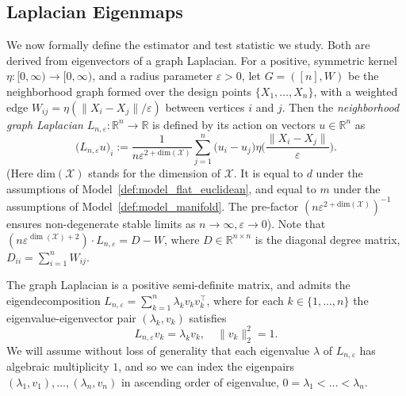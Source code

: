 \documentclass[aos]{imsart}
\theoremstyle{plain}
\theoremstyle{definition}
\theoremstyle{remark}
\def\R{\mathbb{R}}
\newcommand{\mc}[1]{\mathcal{#1}}
\newcommand{\Reals}{\mathbb{R}} %
\newcommand{\1}{\mathbf{1}}
\begin{document}
\subsection{Laplacian Eigenmaps}
\label{subsec:laplacian_eigenmaps}
We now formally define the estimator and test statistic we study. Both are derived from eigenvectors of a graph Laplacian.  For a positive, symmetric kernel $\eta: [0,\infty) \to [0,\infty)$, and a radius parameter $\varepsilon > 0$, let $G = ([n],W)$ be the neighborhood graph formed over the design points $\{X_1,\ldots,X_n\}$, with a weighted edge $W_{ij} = \eta(\|X_i - X_j\|/\varepsilon)$ between vertices $i$ and $j$. Then the 
\emph{neighborhood graph Laplacian} $L_{n,\varepsilon}: \Reals^n \to \Reals$ is defined by its action on vectors $u \in \Reals^n$ as
\begin{equation}
\label{eqn:neighborhood_graph_laplacian}
\bigl(L_{n,\varepsilon}u\bigr)_i := \frac{1}{n\varepsilon^{2 + \mathrm{dim}(\mc{X})}} \sum_{j = 1}^{n} \bigl(u_i - u_j\bigr) \eta\biggl(\frac{\|X_i - X_j\|}{\varepsilon}\biggr).
\end{equation}
(Here $\mathrm{dim}(\mc{X})$ stands for the dimension of $\mc{X}$. It is equal to $d$ under the assumptions of Model~\ref{def:model_flat_euclidean}, and equal to $m$ under the assumptions of Model~\ref{def:model_manifold}. The pre-factor $(n\varepsilon^{2 + \mathrm{dim}(\mc{X})})^{-1}$ ensures non-degenerate stable limits as $n \to \infty, \varepsilon \to 0$). Note that $(n\varepsilon^{\dim(\mc{X}) + 2}) \cdot L_{n,\varepsilon} = D - W$, where $D \in \Reals^{n \times n}$ is the diagonal degree matrix, $D_{ii} = \sum_{i = 1}^{n} W_{ij}$.

The graph Laplacian is a positive semi-definite matrix, and admits the eigendecomposition $L_{n,\varepsilon} = \sum_{k = 1}^{n} \lambda_k v_k v_k^{\top}$, where for each $k \in \{1,\ldots,n\}$ the eigenvalue-eigenvector pair $(\lambda_k,v_k)$ satisfies
\begin{equation*}
L_{n,\varepsilon}v_k = \lambda_k v_k, \quad \|v_k\|_2^2 = 1.
\end{equation*}
We will assume without loss of generality that each eigenvalue $\lambda$ of $L_{n,\varepsilon}$ has algebraic multiplicity $1$, and so we can index the eigenpairs $(\lambda_1,v_1),\ldots,(\lambda_n,v_n)$ in ascending order of eigenvalue, $0 = \lambda_1 < \ldots < \lambda_n$. 
\end{document}
